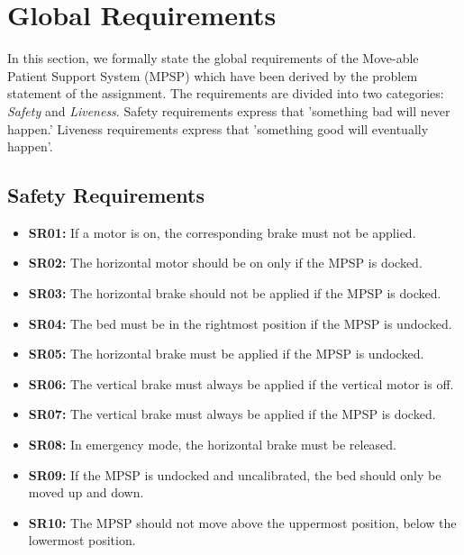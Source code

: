 \label{task1}
\section{Global Requirements}

In this section, we formally state the global requirements of the Move-able Patient Support System (MPSP) which have been derived by the problem statement of the assignment. The requirements are divided into two categories: \textit{Safety} and \textit{Liveness}. Safety requirements express that 'something bad will never happen.' Liveness requirements express that 'something good will eventually happen'. 

\subsection{Safety Requirements}
\begin{itemize}
    \item \textbf{SR01:} If a motor is on, the corresponding brake must not be applied. \\
    \item \textbf{SR02:} The horizontal motor should be on only if the MPSP is docked. \\ 
    \item \textbf{SR03:} The horizontal brake should not be applied if the MPSP is docked. \\ 
    \item \textbf{SR04:} The bed must be in the rightmost position if the MPSP is  undocked. \\ 
    \item \textbf{SR05:} The horizontal brake must be applied if the MPSP is undocked. \\
    \item \textbf{SR06:} The vertical brake must always be applied if the vertical motor is off. \\
    \item \textbf{SR07:} The vertical brake must always be applied if the MPSP is docked. \\ 
    \item \textbf{SR08:} In emergency mode, the horizontal brake must be released. \\
    \item \textbf{SR09:} If the MPSP is undocked and uncalibrated, the bed should only be moved up and down. \\
    \item \textbf{SR10:} The MPSP should not move above the uppermost position, below the lowermost position. \\
\end{itemize}

